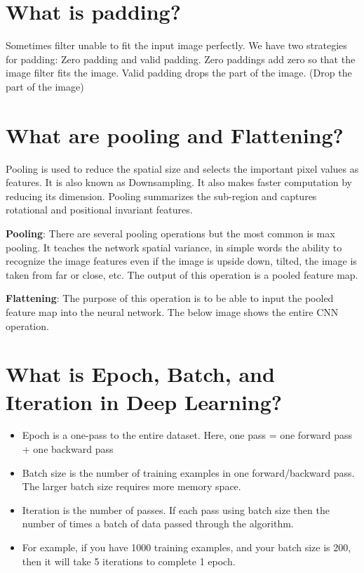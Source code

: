 \documentclass[
]{book}
\begin{document}
\hypertarget{what-is-padding}{%
\section{What is padding?}\label{what-is-padding}}

Sometimes filter unable to fit the input image perfectly. We have two strategies for padding: Zero padding and valid padding. Zero paddings add zero so that the image filter fits the image. Valid padding drops the part of the image. (Drop the part of the image)

\hypertarget{what-are-pooling-and-flattening}{%
\section{What are pooling and Flattening?}\label{what-are-pooling-and-flattening}}

Pooling is used to reduce the spatial size and selects the important pixel values as features. It is also known as Downsampling. It also makes faster computation by reducing its dimension. Pooling summarizes the sub-region and captures rotational and positional invariant features.

\textbf{Pooling}: There are several pooling operations but the most common is max pooling. It teaches the network spatial variance, in simple words the ability to recognize the image features even if the image is upside down, tilted, the image is taken from far or close, etc. The output of this operation is a pooled feature map.

\textbf{Flattening}: The purpose of this operation is to be able to input the pooled feature map into the neural network.
The below image shows the entire CNN operation.

\hypertarget{what-is-epoch-batch-and-iteration-in-deep-learning}{%
\section{What is Epoch, Batch, and Iteration in Deep Learning?}\label{what-is-epoch-batch-and-iteration-in-deep-learning}}

\begin{itemize}
\item
  Epoch is a one-pass to the entire dataset. Here, one pass = one forward pass + one backward pass
\item
  Batch size is the number of training examples in one forward/backward pass. The larger batch size requires more memory space.
\item
  Iteration is the number of passes. If each pass using batch size then the number of times a batch of data passed through the algorithm.
\item
  For example, if you have 1000 training examples, and your batch size is 200, then it will take 5 iterations to complete 1 epoch.
\end{itemize}
\end{document}
